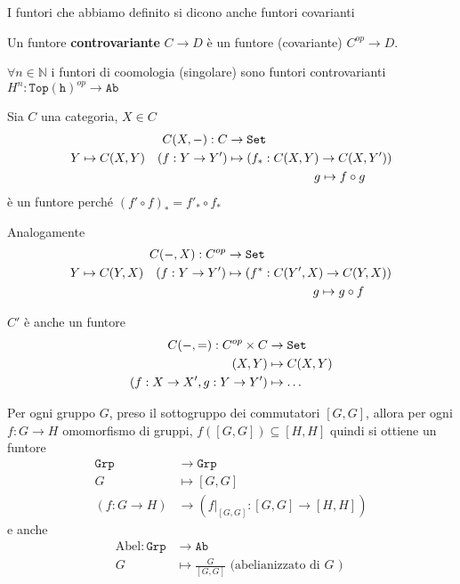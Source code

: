 \begin{note}{}
    I funtori che abbiamo definito si dicono anche funtori covarianti
\end{note}
\begin{definition}{}
    Un funtore \textbf{controvariante} \(C \to D\) è un funtore (covariante) \(C^{op} \to D\).
\end{definition}
\begin{example}{}
    \(\forall n \in \mathbb{N}\) i funtori di coomologia (singolare) sono funtori
    controvarianti \(H^{n} : \mathtt{Top(h)}^{op} \to \mathtt{Ab}\) 
\end{example}
\begin{example}{}
    Sia \(C\) una categoria, \(X \in C\)
    \begin{align*}
        C{(X, \--)} : C &\to \mathtt{Set} \\
        Y \mapsto C{(X, Y)} \quad {(f : Y \to Y')} &\mapsto {(f_{*} : C{(X, Y)} \to C{(X, Y')})} \\
            & \quad \quad \quad \quad\quad\quad\quad  g \mapsto f \circ g
    \end{align*}
    è un funtore perché \({(f' \circ f)}_* = f'_* \circ f_*\) 

    Analogamente 
    \begin{align*}
        C{(\--, X)} : C^{op} &\to \mathtt{Set} \\
        Y \mapsto C{(Y, X)} \quad {(f : Y \to Y')} &\mapsto {(f^{*} : C{(Y', X)} \to C{(Y, X)})} \\
            & \quad \quad \quad \quad\quad\quad\quad  g \mapsto g \circ f
    \end{align*}
\end{example}
\begin{remark}{}
    \(C'\) è anche un funtore 
    \begin{align*}
        C{(\--, =)} : C^{op} \times C &\to \mathtt{Set} \\
        {(X, Y)} &\mapsto C{(X, Y)} \\
        {(f : X \to X', g : Y \to Y')} &\mapsto \dots
    \end{align*}
\end{remark}
\begin{example}{}
    Per ogni gruppo \(G\), preso il sottogruppo dei commutatori \([G, G]\),
    allora per ogni \(f : G \to H\) omomorfismo di gruppi, \(f{([G, G])} \subseteq [H, H] \) 
    quindi si ottiene un funtore
    \begin{align*}{}
        \mathtt{Grp} &\to \mathtt{Grp} \\
        G &\mapsto [G, G] \\
        {(f : G \to H)} &\to {(f |_{[G, G]} : [G, G] \to [H, H] )}
    \end{align*}
    e anche 
    \begin{align*}
        \mathrm{Abel} : \mathtt{Grp} &\to \mathtt{Ab} \\
        G &\mapsto \frac{G}{[G, G]} \text{ (abelianizzato di \(G\) ) }
    \end{align*}
\end{example}

